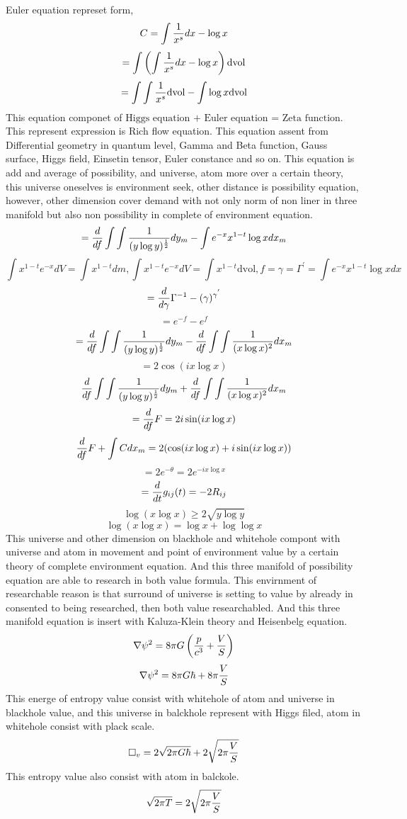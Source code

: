 \documentclass{jsarticle}
\begin{document}
  Euler equation represet form,
  $$ C = \int {1 \over x^s}dx - \log x $$
  $$ = \int \left(\int {1 \over x^s}dx - \log x \right)\mathrm{dvol} $$
  $$ = \int \int{1 \over x^s}\mathrm{dvol} - \int  \log x \mathrm{dvol} $$
  This equation componet of $ \text{Higgs equation + Euler equation =
  Zeta function} $. This represent expression is Rich flow equation.
  This equation assent from Differential geometry in quantum level,
  Gamma and Beta function, Gauss surface, Higgs field, Einsetin tensor,
  Euler constance and so on.
    This equation is add and average of possibility, and universe, atom
  more over a certain theory, this universe oneselves is environment
  seek, other distance is possibility equation, however, other dimension
  cover demand with not only norm of non liner in three manifold
  but also non possibility in complete of environment equation.
    $$ = {d \over df} \int \int{1 \over (y \log y)^{1 \over 2}}dy_m 
  - \int e^{-x}x^{1 - t} \log x dx_m $$
  $$ \int x^{1 - t}e^{-x}dV = \int x^{1 - t}dm, \int x^{1 - t}e^{-x}dV
  = \int x^{1 - t}\mathrm{dvol}, f = \gamma = \Gamma^{'} = \int 
  e^{-x}x^{1 - t} \log x dx $$
  $$ = {d \over d \gamma}\Gamma^{-1} - (\gamma)^{\gamma^{'}} $$
  $$ = e^{-f} - e^{f} $$
  $$ = {d \over df}\int \int{1 \over (y \log y)^{1 \over 2}}dy_m
  - {d \over df}\int\int {1 \over (x \log x)^2}dx_m $$
  $$ = 2 \cos (i x \log x) $$
  $$  {d \over df}\int\int{1 \over (y \log y)^{1 \over 2}}dy_m
  + {d \over df}\int\int{1 \over (x \log x)^2}dx_m $$
  $$ = {d \over df}F = 2 i \sin (i x \log x) $$
  $$ {d \over df}F + \int C dx_m  
  = 2 (\cos( i x \log x) + i \sin(i x \log x)) $$
  $$ = 2 e^{- \theta} = 2 e^{- i x \log x} $$
  $$ = {d \over dt}g_{ij}(t) = - 2 R_{ij} $$
  $$ \log (x \log x) \ge 2 \sqrt{y \log y} $$
  $$ \log(x \log x) = \log x + \log \log x $$
  This universe and other dimension on blackhole and whitehole
  compont with universe and atom in movement and point of 
  environment value by a certain theory of complete environment 
  equation. And this three manifold of possibility equation 
  are able to research in both value formula.
  This envirnment of researchable reason is that surround of universe
  is setting to value by already in consented to being researched,
  then both value researchabled.
  And this three manifold equation is insert with Kaluza-Klein theory
  and Heisenbelg equation.
    $$ \nabla \psi^2 = 8 \pi G\left({p \over c^3} + {V \over S}\right) $$
  $$ \nabla \psi^2 = 8 \pi G \hbar + 8 \pi {V \over S} $$
  This energe of entropy value consist with whitehole of atom
  and universe in blackhole value, and this universe in balckhole 
  represent with Higgs filed, atom in whitehole consist with plack scale.
    $$ \square_v = 2 \sqrt{2 \pi G \hbar} + 2 \sqrt{2 \pi {V \over S}} $$
  This entropy value also consist with atom in balckole.
    $$ \sqrt{2 \pi T} = 2 \sqrt{2 \pi{V \over S}} $$
\end{document}
